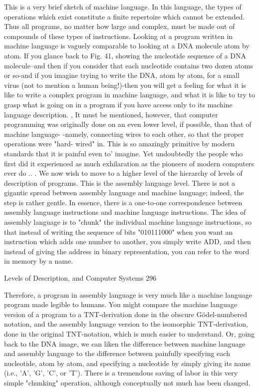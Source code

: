        This is a very brief sketch of machine language. In this language, the types of
       operations which exist constitute a finite repertoire which cannot be extended.
       Thus all programs, no matter how large and complex, must be made out of
       compounds of these types of instructions. Looking at a program written in
       machine language is vaguely comparable to looking at a DNA molecule atom by
       atom. If you glance back to Fig. 41, showing the nucleotide sequence of a DNA
       molecule--and then if you consider that each nucleotide contains two dozen atoms
       or so-and if you imagine trying to write the DNA, atom by atom, for a small virus
       (not to mention a human being!)-then you will get a feeling for what it is like to
       write a complex program in machine language, and what it is like to try to grasp
       what is going on in a program if you have access only to its machine language
       description. ,
               It must be mentioned, however, that computer programming was
       originally done on an even lower level, if possible, than that of machine language-
       -namely, connecting wires to each other, so that the proper operations were "hard-
       wired" in. This is so amazingly primitive by modern standards that it is painful
       even to' imagine. Yet undoubtedly the people who first did it experienced as much
       exhilaration as the pioneers of modern computers ever do .. .
               We now wish to move to a higher level of the hierarchy of levels of
       description of programs. This is the assembly language level. There is not a
       gigantic spread between assembly language and machine language; indeed, the
       step is rather gentle. In essence, there is a one-to-one correspondence between
       assembly language instructions and machine language instructions. The idea of
       assembly language is to "chunk" the individual machine language instructions, so
       that instead of writing the sequence of bits "010111000" when you want an
       instruction which adds one number to another, you simply write ADD, and then
       instead of giving the address in binary representation, you can refer to the word in
       memory by a name.




Levels of Description, and Computer Systems                                             296

       Therefore, a program in assembly language is very much like a machine language
       program made legible to humans. You might compare the machine language
       version of a program to a TNT-derivation done in the obscure Gödel-numbered
       notation, and the assembly language version to the isomorphic TNT-derivation,
       done in the original TNT-notation, which is much easier to understand. Or, going
       back to the DNA image, we can liken the difference between machine language
       and assembly language to the difference between painfully specifying each
       nucleotide, atom by atom, and specifying a nucleotide by simply giving its name
       (i.e., 'A', 'G', 'C', or 'T'). There is a tremendous saving of labor in this very
       simple "chunking" operation, although conceptually not much has been changed.

